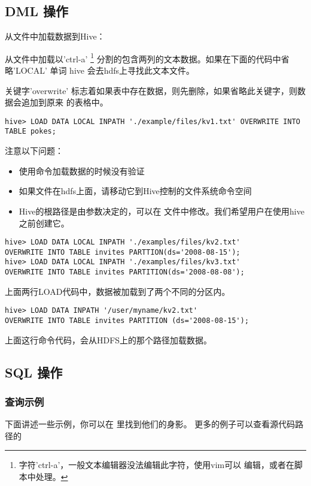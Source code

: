 \documentclass{article}
\begin{document}
\subsection{DML 操作}
从文件中加载数据到Hive：

从文件中加载以'ctrl-a' \footnote{字符'ctrl-a'，一般文本编辑器没法编辑此字符，使用vim可以
编辑，或者在脚本中处理。} 分割的包含两列的文本数据。如果在下面的代码中省略'LOCAL' 单词
hive 会去hdfs上寻找此文本文件。

关键字'overwrite' 标志着如果表中存在数据，则先删除，如果省略此关键字，则数据会追加到原来
的表格中。

\begin{verbatim}
hive> LOAD DATA LOCAL INPATH './example/files/kv1.txt' OVERWRITE INTO TABLE pokes;
\end{verbatim}

注意以下问题：

\begin{itemize}
\item 使用命令加载数据的时候没有验证
\item 如果文件在hdfs上面，请移动它到Hive控制的文件系统命令空间
\item Hive的根路径是由参数决定的，可以在
文件中修改。我们希望用户在使用hive之前创建它。
\end{itemize}

\begin{verbatim}
hive> LOAD DATA LOCAL INPATH './examples/files/kv2.txt' 
OVERWRITE INTO TABLE invites PARTTION(ds='2008-08-15');
hive> LOAD DATA LOCAL INPATH './examples/files/kv3.txt' 
OVERWRITE INTO TABLE invites PARTITION(ds='2008-08-08');
\end{verbatim}

上面两行LOAD代码中，数据被加载到了两个不同的分区内。

\begin{verbatim}
hive> LOAD DATA INPATH '/user/myname/kv2.txt' 
OVERWRITE INTO TABLE invites PARTITION (ds='2008-08-15');
\end{verbatim}

上面这行命令代码，会从HDFS上的那个路径加载数据。

\subsection{SQL 操作}
\subsubsection{查询示例}
下面讲述一些示例，你可以在 里找到他们的身影。
更多的例子可以查看源代码路径的
\end{document}

